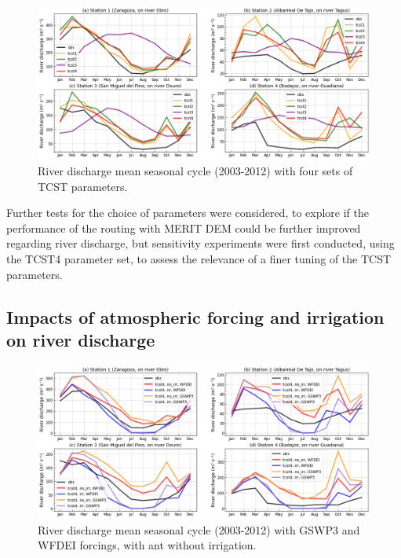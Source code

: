 \begin{figure}[htbp]
    \centering
    \includegraphics[width=\textwidth]{images/chap3/river_discharge/merit_tcst_4stations_SC.png}
    \caption{River discharge mean seasonal cycle (2003-2012) with four sets of TCST parameters.}
    \label{fig:merit_tcsts_stations_SC}
\end{figure}

Further tests for the choice of parameters were considered, to explore if the performance of the \native routing with MERIT DEM could be further improved regarding river discharge, but sensitivity experiments were first conducted, using the TCST4 parameter set, to assess the relevance of a finer tuning of the TCST parameters.

\subsection{Impacts of atmospheric forcing and irrigation on river discharge}

\begin{figure}[htbp]
    \centering
    \includegraphics[width=\textwidth]{images/chap3/river_discharge/merit_forcing_4stations_SC.png}
    \caption{River discharge mean seasonal cycle (2003-2012) with GSWP3 and WFDEI forcings, with ant without irrigation.}
    \label{fig:merit_forcing_stations_SC}
\end{figure}

